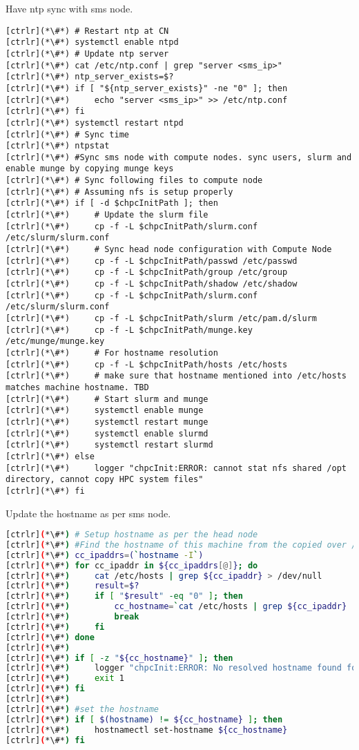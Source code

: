 Have ntp sync with sms node. 


\begin{lstlisting}
[ctrlr](*\#*) # Restart ntp at CN
[ctrlr](*\#*) systemctl enable ntpd
[ctrlr](*\#*) # Update ntp server
[ctrlr](*\#*) cat /etc/ntp.conf | grep "server <sms_ip>"
[ctrlr](*\#*) ntp_server_exists=$?
[ctrlr](*\#*) if [ "${ntp_server_exists}" -ne "0" ]; then
[ctrlr](*\#*)     echo "server <sms_ip>" >> /etc/ntp.conf
[ctrlr](*\#*) fi
[ctrlr](*\#*) systemctl restart ntpd
[ctrlr](*\#*) # Sync time
[ctrlr](*\#*) ntpstat
[ctrlr](*\#*) #Sync sms node with compute nodes. sync users, slurm and enable munge by copying munge keys
[ctrlr](*\#*) # Sync following files to compute node
[ctrlr](*\#*) # Assuming nfs is setup properly
[ctrlr](*\#*) if [ -d $chpcInitPath ]; then
[ctrlr](*\#*)     # Update the slurm file
[ctrlr](*\#*)     cp -f -L $chpcInitPath/slurm.conf /etc/slurm/slurm.conf
[ctrlr](*\#*)     # Sync head node configuration with Compute Node
[ctrlr](*\#*)     cp -f -L $chpcInitPath/passwd /etc/passwd
[ctrlr](*\#*)     cp -f -L $chpcInitPath/group /etc/group
[ctrlr](*\#*)     cp -f -L $chpcInitPath/shadow /etc/shadow
[ctrlr](*\#*)     cp -f -L $chpcInitPath/slurm.conf /etc/slurm/slurm.conf
[ctrlr](*\#*)     cp -f -L $chpcInitPath/slurm /etc/pam.d/slurm
[ctrlr](*\#*)     cp -f -L $chpcInitPath/munge.key /etc/munge/munge.key
[ctrlr](*\#*)     # For hostname resolution
[ctrlr](*\#*)     cp -f -L $chpcInitPath/hosts /etc/hosts
[ctrlr](*\#*)     # make sure that hostname mentioned into /etc/hosts matches machine hostname. TBD
[ctrlr](*\#*)     # Start slurm and munge 
[ctrlr](*\#*)     systemctl enable munge
[ctrlr](*\#*)     systemctl restart munge
[ctrlr](*\#*)     systemctl enable slurmd
[ctrlr](*\#*)     systemctl restart slurmd
[ctrlr](*\#*) else
[ctrlr](*\#*)     logger "chpcInit:ERROR: cannot stat nfs shared /opt directory, cannot copy HPC system files"
[ctrlr](*\#*) fi
\end{lstlisting}
Update the hostname as per sms node.


\begin{lstlisting}[language=bash,keywords={}]
[ctrlr](*\#*) # Setup hostname as per the head node
[ctrlr](*\#*) #Find the hostname of this machine from the copied over /etc/hosts file
[ctrlr](*\#*) cc_ipaddrs=(`hostname -I`)
[ctrlr](*\#*) for cc_ipaddr in ${cc_ipaddrs[@]}; do
[ctrlr](*\#*)     cat /etc/hosts | grep ${cc_ipaddr} > /dev/null
[ctrlr](*\#*)     result=$?
[ctrlr](*\#*)     if [ "$result" -eq "0" ]; then
[ctrlr](*\#*)         cc_hostname=`cat /etc/hosts | grep ${cc_ipaddr} | cut -d$'\t' -f2`
[ctrlr](*\#*)         break
[ctrlr](*\#*)     fi
[ctrlr](*\#*) done
[ctrlr](*\#*) 
[ctrlr](*\#*) if [ -z "${cc_hostname}" ]; then
[ctrlr](*\#*)     logger "chpcInit:ERROR: No resolved hostname found for any IP address in /etc/hosts"
[ctrlr](*\#*)     exit 1
[ctrlr](*\#*) fi
[ctrlr](*\#*) 
[ctrlr](*\#*) #set the hostname
[ctrlr](*\#*) if [ $(hostname) != ${cc_hostname} ]; then
[ctrlr](*\#*)     hostnamectl set-hostname ${cc_hostname}
[ctrlr](*\#*) fi
\end{lstlisting}

